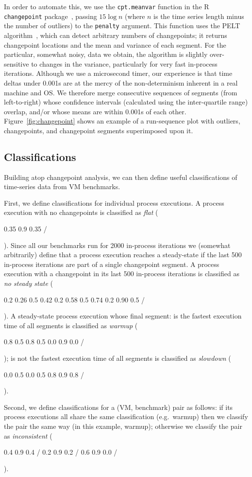 \documentclass[preprint,numbers,10pt]{sigplanconf}
\DeclareRobustCommand{\flatc}{%
\setlength{\sparklinethickness}{0.4pt}%
\begin{sparkline}{1.5}
\spark 0.1 0.35
       0.9 0.35
       /%
\end{sparkline}\xspace}
\DeclareRobustCommand{\nosteadystate}{%
\setlength{\sparklinethickness}{0.4pt}%
\begin{sparkline}{1.5}
\spark 0.1 0.2
       0.26 0.5
       0.42 0.2
       0.58 0.5
       0.74 0.2
       0.90 0.5
       /%
\end{sparkline}\xspace}
\DeclareRobustCommand{\warmup}{%
\setlength{\sparklinethickness}{0.4pt}%
\begin{sparkline}{1.5}
\spark 0.1 0.8
       0.5 0.8
       0.5 0.0
       0.9 0.0
       /%
\end{sparkline}\xspace}
\DeclareRobustCommand{\slowdown}{%
\setlength{\sparklinethickness}{0.4pt}%
\begin{sparkline}{1.5}
\spark 0.1 0.0
       0.5 0.0
       0.5 0.8
       0.9 0.8
       /%
\end{sparkline}\xspace}
\DeclareRobustCommand{\inconsistent}{%
\setlength{\sparklinethickness}{0.4pt}%
\begin{sparkline}{1.5}
\spark 0.1 0.4
       0.9 0.4
       /%
\spark 0.1 0.2
       0.9 0.2
       /%
\spark 0.1 0.6
       0.9 0.0
       /%
\end{sparkline}\xspace}
\begin{document}
In order to automate this, we use the \texttt{cpt.meanvar} function in the R
\texttt{changepoint} package~\cite{killick14changepoint}, passing $15\log{n}$ (where
$n$ is the time series length minus the number of outliers) to the
\texttt{penalty} argument. This function uses the PELT
algorithm~\citep{killick12optimal}, which can detect arbitrary numbers of changepoints; it
returns changepoint locations and the mean and variance
of each segment. For the particular, somewhat noisy, data we obtain, the
algorithm is slightly over-sensitive to changes in the variance, particularly
for very fast in-process iterations. Although we use a microsecond timer, our experience
is that time deltas under 0.001s are at the mercy of the non-determinism
inherent in a real machine and OS. We therefore merge consecutive sequences of segments (from
left-to-right) whose confidence intervals (calculated using the inter-quartile
range) overlap, and/or whose means are within 0.001s of each other.
Figure~\ref{fig:changepoint} shows an example of a run-sequence plot with
outliers, changepoints, and changepoint segments superimposed upon it.


\subsection{Classifications}

Building atop changepoint analysis, we can then define useful classifications of
time-series data from VM benchmarks.

First, we define classifications for individual process executions. A process
execution with no changepoints is classified as
\emph{flat} (\flatc). Since all our benchmarks run for 2000 in-process
iterations we (somewhat arbitrarily) define that a process execution reaches a
steady-state if the last 500 in-process iterations are part of a single
changepoint segment. A process execution with a changepoint in its last
500 in-process iterations is classified as \emph{no steady state}
(\nosteadystate). A steady-state process execution whose final segment:
is the fastest execution time of all segments is classified as \emph{warmup}
(\warmup); is not the fastest execution time of all segments is classified as
\emph{slowdown} (\slowdown).

Second, we define classifications for a (VM, benchmark) pair as follows:
if its process executions all share the same classification (e.g.~warmup) then
we classify the pair the same way (in this example, warmup); otherwise we classify the pair as
\emph{inconsistent} (\inconsistent).
\end{document}

